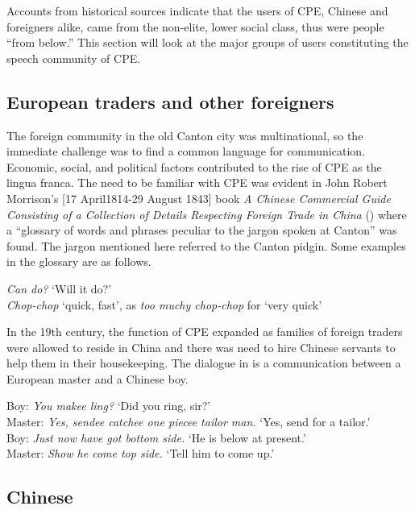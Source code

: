 \documentclass[output=paper]{langsci/langscibook}
\begin{document}
Accounts from historical sources indicate that the users of CPE, Chinese and foreigners alike, came from the non-elite, lower social class, thus were people “from below.” This section will look at the major groups of users constituting the speech community of CPE. 

\subsection{European traders and other foreigners}

The foreign community in the old Canton city was multinational, so the immediate challenge was to find a common language for communication. Economic, social, and political factors contributed to the rise of CPE as the lingua franca. The need to be familiar with CPE was evident in John Robert Morrison’s [17 April1814-29 August 1843] book \textit{A Chinese Commercial Guide Consisting of a Collection of Details Respecting Foreign Trade in China} (\citeyear{morrison_chinese_1834}) where a “glossary of words and phrases peculiar to the jargon spoken at Canton” was found. The jargon mentioned here referred to the Canton pidgin. Some examples in the glossary are as follows.

\ea 
    \label{ex:7:1}
    \textit{Can do?} ‘Will it do?’\\
    \textit{Chop-chop} ‘quick, fast’, as \textit{too muchy chop-chop} for ‘very quick’
\z

In the 19th century, the function of CPE expanded as families of foreign traders were allowed to reside in China and there was need to hire Chinese servants to help them in their housekeeping. The dialogue in  is a communication between a European master and a Chinese boy. 

\ea \label{ex:7:2}
Boy: \textit{You makee ling?} ‘Did you ring, sir?’\\
Master: \textit{Yes, sendee catchee one piecee tailor man.} ‘Yes, send for a tailor.’\\
Boy: \textit{Just now have got bottom side.} ‘He is below at present.’\\
Master: \textit{Show he come top side.} ‘Tell him to come up.’\\

\citep[43]{anonymous_englishman_1860}
\z

\subsection{Chinese}
\end{document}
